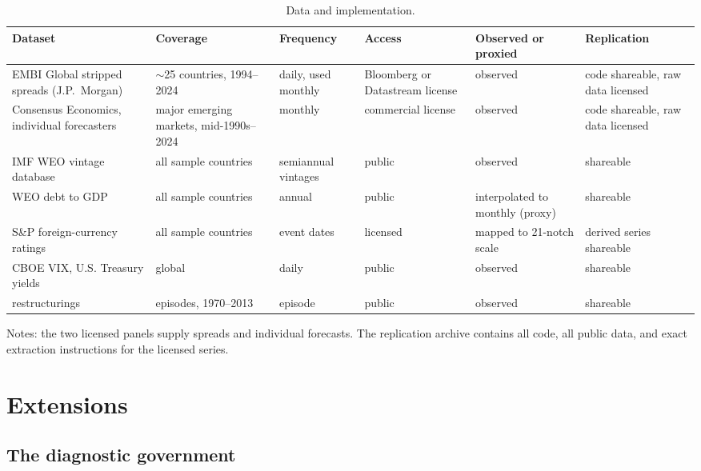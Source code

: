 \documentclass[11pt]{article}
\theoremstyle{definition}
\begin{document}
\begin{table}[t]
\centering
\caption{Data and implementation.}
\label{tab:feasibility}
\footnotesize
\setlength{\tabcolsep}{4pt}
\begin{tabular}{p{3.2cm}p{2.8cm}p{1.7cm}p{2.1cm}p{2.0cm}p{1.8cm}}
\toprule
Dataset & Coverage & Frequency & Access & Observed or proxied & Replication \\
\midrule
EMBI Global stripped spreads (J.P.~Morgan) & $\sim$25 countries, 1994--2024 & daily, used monthly & Bloomberg or Datastream license & observed & code shareable, raw data licensed \\
Consensus Economics, individual forecasters & major emerging markets, mid-1990s--2024 & monthly & commercial license & observed & code shareable, raw data licensed \\
IMF WEO vintage database & all sample countries & semiannual vintages & public & observed & shareable \\
WEO debt to GDP & all sample countries & annual & public & interpolated to monthly (proxy) & shareable \\
S\&P foreign-currency ratings & all sample countries & event dates & licensed & mapped to 21-notch scale & derived series shareable \\
CBOE VIX, U.S. Treasury yields & global & daily & public & observed & shareable \\
\citet{CrucesTrebesch2013} restructurings & episodes, 1970--2013 & episode & public & observed & shareable \\
\bottomrule
\end{tabular}
\par\smallskip
\begin{minipage}{0.95\textwidth}
\footnotesize Notes: the two licensed panels supply spreads and individual forecasts. The replication archive contains all code, all public data, and exact extraction instructions for the licensed series.
\end{minipage}
\end{table}

\section{Extensions}\label{app:extensions}

\subsection{The diagnostic government}\label{app:diaggov}
\end{document}

